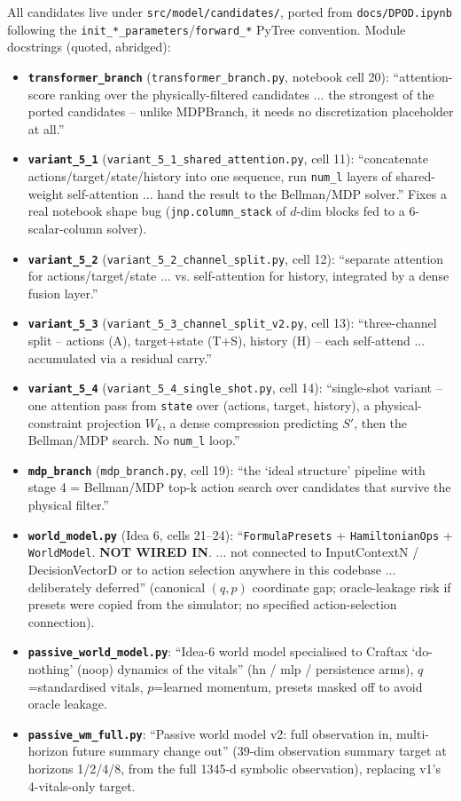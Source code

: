 \documentclass[11pt]{article}
\newcommand{\srcpath}[1]{\texttt{\small #1}}
\begin{document}
All candidates live under \srcpath{src/model/candidates/}, ported from \srcpath{docs/DPOD.ipynb}
following the \texttt{init\_*\_parameters}/\texttt{forward\_*} PyTree convention. Module docstrings
(quoted, abridged):
\begin{itemize}
\item \textbf{\texttt{transformer\_branch}} (\srcpath{transformer\_branch.py}, notebook cell 20): ``attention-score ranking over the physically-filtered candidates ... the strongest of the ported candidates -- unlike MDPBranch, it needs no discretization placeholder at all.''
\item \textbf{\texttt{variant\_5\_1}} (\srcpath{variant\_5\_1\_shared\_attention.py}, cell 11): ``concatenate actions/target/state/history into one sequence, run \texttt{num\_l} layers of shared-weight self-attention ... hand the result to the Bellman/MDP solver.'' Fixes a real notebook shape bug (\texttt{jnp.column\_stack} of $d$-dim blocks fed to a 6-scalar-column solver).
\item \textbf{\texttt{variant\_5\_2}} (\srcpath{variant\_5\_2\_channel\_split.py}, cell 12): ``separate attention for actions/target/state ... vs. self-attention for history, integrated by a dense fusion layer.''
\item \textbf{\texttt{variant\_5\_3}} (\srcpath{variant\_5\_3\_channel\_split\_v2.py}, cell 13): ``three-channel split -- actions (A), target+state (T+S), history (H) -- each self-attend ... accumulated via a residual carry.''
\item \textbf{\texttt{variant\_5\_4}} (\srcpath{variant\_5\_4\_single\_shot.py}, cell 14): ``single-shot variant -- one attention pass from \texttt{state} over (actions, target, history), a physical-constraint projection $W_k$, a dense compression predicting $S'$, then the Bellman/MDP search. No \texttt{num\_l} loop.''
\item \textbf{\texttt{mdp\_branch}} (\srcpath{mdp\_branch.py}, cell 19): ``the `ideal structure' pipeline with stage 4 = Bellman/MDP top-k action search over candidates that survive the physical filter.''
\item \textbf{\texttt{world\_model.py}} (Idea 6, cells 21--24): ``\texttt{FormulaPresets} + \texttt{HamiltonianOps} + \texttt{WorldModel}. \textbf{NOT WIRED IN}. ... not connected to InputContextN / DecisionVectorD or to action selection anywhere in this codebase ... deliberately deferred'' (canonical $(q,p)$ coordinate gap; oracle-leakage risk if presets were copied from the simulator; no specified action-selection connection).
\item \textbf{\texttt{passive\_world\_model.py}}: ``Idea-6 world model specialised to Craftax `do-nothing' (noop) dynamics of the vitals'' (hn / mlp / persistence arms), $q$=standardised vitals, $p$=learned momentum, presets masked off to avoid oracle leakage.
\item \textbf{\texttt{passive\_wm\_full.py}}: ``Passive world model v2: full observation in, multi-horizon future summary change out'' (39-dim observation summary target at horizons 1/2/4/8, from the full 1345-d symbolic observation), replacing v1's 4-vitals-only target.
\end{itemize}
\end{document}
